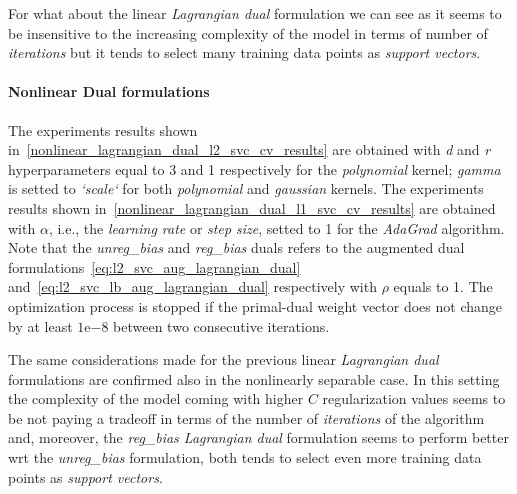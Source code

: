 For what about the linear \emph{Lagrangian dual} formulation we can see as it seems to be insensitive to the increasing complexity of the model in terms of number of \emph{iterations} but it tends to select many training data points as \emph{support vectors}.

\paragraph{Nonlinear Dual formulations}

The experiments results shown in~\ref{nonlinear_lagrangian_dual_l2_svc_cv_results} are obtained with \emph{d} and \emph{r} hyperparameters equal to 3 and 1 respectively for the \emph{polynomial} kernel; \emph{gamma} is setted to \emph{`scale`} for both \emph{polynomial} and \emph{gaussian} kernels. The experiments results shown in~\ref{nonlinear_lagrangian_dual_l1_svc_cv_results} are obtained with $\alpha$, i.e., the \emph{learning rate} or \emph{step size}, setted to 1 for the \emph{AdaGrad} algorithm. Note that the \emph{unreg\_bias} and \emph{reg\_bias} duals refers to the augmented dual formulations~\eqref{eq:l2_svc_aug_lagrangian_dual} and~\eqref{eq:l2_svc_lb_aug_lagrangian_dual} respectively with $\rho$ equals to 1. The optimization process is stopped if the primal-dual weight vector does not change by at least $1\mathrm{e}{-8}$  between two consecutive iterations.



The same considerations made for the previous linear \emph{Lagrangian dual} formulations are confirmed also in the nonlinearly separable case. In this setting the complexity of the model coming with higher $C$ regularization values seems to be not paying a tradeoff in terms of the number of \emph{iterations} of the algorithm and, moreover, the \emph{reg\_bias Lagrangian dual} formulation seems to perform better wrt the \emph{unreg\_bias} formulation, both tends to select even more training data points as \emph{support vectors}.


